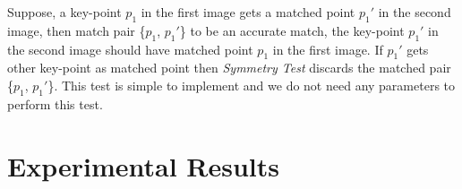 \noindent Suppose, a key-point $p_1$ in the first image gets a matched point $p_1'$ in the second image, then match pair \{$p_1$, $p_1'$\} to be an accurate match, the key-point $p_1'$ in the second image should have matched point $p_1$ in the first image. If $p_1'$ gets other key-point as matched point then \emph{Symmetry Test} discards the matched pair \{$p_1$, $p_1'$\}. This test is simple to implement and we do not need any parameters to perform this test.

\newpage
\section{Experimental Results}
\label{sec:feature-matching-experimental-result}



